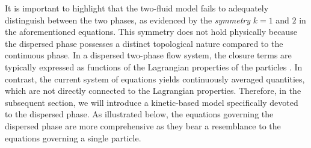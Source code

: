 It is important to highlight that the two-fluid model fails to adequately distinguish between the two phases, as evidenced by the \textit{symmetry} $k = 1$ and $2$ in the aforementioned equations. This symmetry does not hold physically because the dispersed phase possesses a distinct topological nature compared to the continuous phase. 
In a dispersed two-phase flow system, the closure terms are typically expressed as functions of the Lagrangian properties of the particles \citep{jackson2000}. In contrast, the current system of equations yields continuously averaged quantities, which are not directly connected to the Lagrangian properties.
Therefore, in the subsequent section, we will introduce a kinetic-based model specifically devoted to the dispersed phase. 
As illustrated below, the equations governing the dispersed phase are more comprehensive as they bear a resemblance to the equations governing a single particle.

